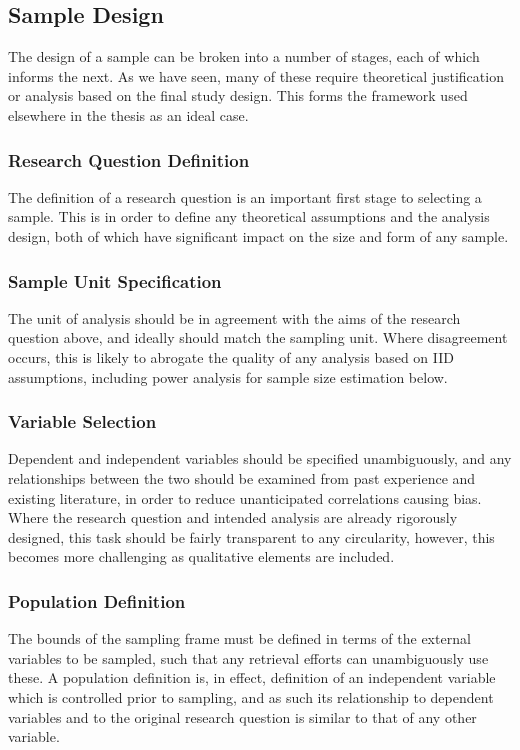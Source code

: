 \subsection{Sample Design}
The design of a sample can be broken into a number of stages, each of which informs the next.  As we have seen, many of these require theoretical justification or analysis based on the final study design.  This forms the framework used elsewhere in the thesis as an ideal case.

%

\subsubsection{Research Question Definition}
The definition of a research question is an important first stage to selecting a sample.  This is in order to define any theoretical assumptions and the analysis design, both of which have significant impact on the size and form of any sample.

\subsubsection{Sample Unit Specification}
The unit of analysis should be in agreement with the aims of the research question above, and ideally should match the sampling unit.  Where disagreement occurs, this is likely to abrogate the quality of any analysis based on IID assumptions, including power analysis for sample size estimation below.

\subsubsection{Variable Selection}
Dependent and independent variables should be specified unambiguously, and any relationships between the two should be examined from past experience and existing literature, in order to reduce unanticipated correlations causing bias.  Where the research question and intended analysis are already rigorously designed, this task should be fairly transparent to any circularity, however, this becomes more challenging as qualitative elements are included.

\subsubsection{Population Definition}
The bounds of the sampling frame must be defined in terms of the external variables to be sampled, such that any retrieval efforts can unambiguously use these.  A population definition is, in effect, definition of an independent variable which is controlled prior to sampling, and as such its relationship to dependent variables and to the original research question is similar to that of any other variable.

